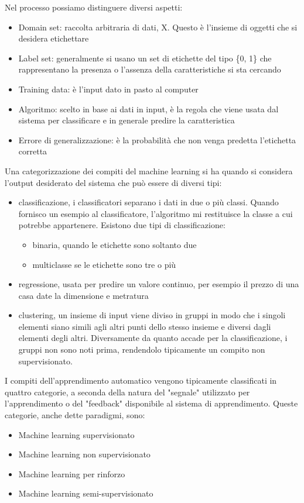 \documentclass[12pt,italian]{report}
\begin{document}
Nel processo possiamo distinguere diversi aspetti:
\begin{itemize}
	\item Domain set: raccolta arbitraria di dati, X. Questo è l'insieme di oggetti che si desidera etichettare
	\item Label set: generalmente si usano un set di etichette del tipo \{0, 1\} che rappresentano la presenza o l'assenza della caratteristiche si sta cercando
	\item Training data: è l'input dato in pasto al computer
	\item Algoritmo: scelto in base ai dati in input, è la regola che viene usata dal sistema per classificare e in generale predire la caratteristica
	\item Errore di generalizzazione: è la probabilità che non venga predetta l'etichetta corretta 
\end{itemize}
Una categorizzazione dei compiti del machine learning si ha quando si considera l'output desiderato del sistema che può essere di diversi tipi:
\begin{itemize}
	\item classificazione, i classificatori separano i dati in due o più classi. Quando fornisco un esempio al classificatore, l'algoritmo mi restituisce la classe a cui potrebbe appartenere.
	Esistono due tipi di classificazione:
	\begin{itemize}
		\item binaria, quando le etichette sono soltanto due
		\item multiclasse se le etichette sono tre o più
	\end{itemize}
	\item regressione, usata per predire un valore continuo, per esempio il prezzo di una casa date la dimensione e metratura
	\item clustering, un insieme di input viene diviso in gruppi in modo che i singoli elementi siano simili agli altri punti dello stesso insieme e diversi dagli elementi degli altri. Diversamente da quanto accade per la classificazione, i gruppi non sono noti prima, rendendolo tipicamente un compito non supervisionato.
\end{itemize}
I compiti dell'apprendimento automatico vengono tipicamente classificati in quattro categorie, a seconda della natura del "segnale" utilizzato per l'apprendimento o del "feedback" disponibile al sistema di apprendimento. Queste categorie, anche dette paradigmi, sono:
\begin{itemize}
	\item Machine learning supervisionato
	\item Machine learning non supervisionato
	\item Machine learning per rinforzo
	\item Machine learning semi-supervisionato
	
\end{itemize}
\end{document}
